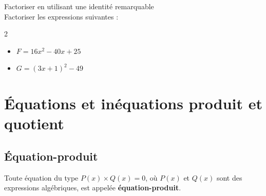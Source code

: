 \begin{Méthode}Factoriser en utilisant une identité remarquable \\
Factoriser les expressions suivantes : \\
\begin{multicols}{2}
\begin{itemize}[label=\textcolor{Couleur3}{$\bullet$}]
\item $F = 16x^2-40x+25$ 
\item $G=(3x+1)^2-49$  
\end{itemize}
\end{multicols}

\vspace{0.5cm}

\begin{minipage}[c]{0.5\linewidth}

\ligne

\ligne

\ligne

\ligne

\ligne

\ligne

\end{minipage} \hfill
\begin{minipage}[c]{0.5\linewidth}

\ligne

\ligne

\ligne

\ligne

\ligne

\ligne

\end{minipage}




\end{Méthode}


\newpage


\section{Équations et inéquations produit et quotient}

\subsection{Équation-produit}

\begin{Définition}
Toute équation du type $P(x) \times Q(x) = 0$, où $P(x)$ et $Q(x)$ sont des expressions algébriques, est appelée {\bf{équation-produit}}.

\end{Définition}


